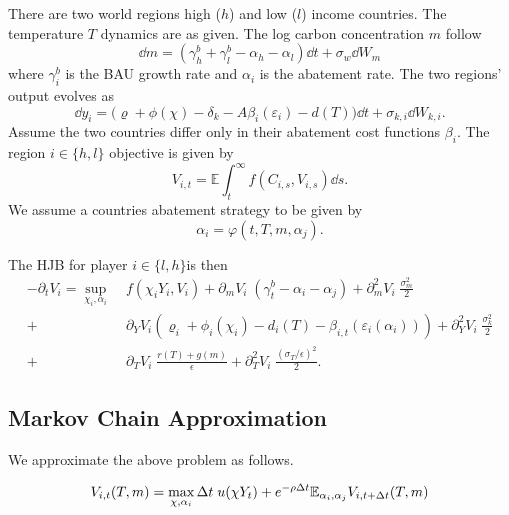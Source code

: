 \documentclass[../../main.tex]{subfiles}
\begin{document}
There are two world regions high ($h$) and low ($l$) income countries. The temperature $T$ dynamics are as given. The log carbon concentration $m$ follow \begin{equation}
    \dd{m} = \left( \gamma^b_h + \gamma^b_l - \alpha_h - \alpha_l \right) \dd{t} + \sigma_w \dd{W}_m
\end{equation} where $\gamma^b_i$ is the BAU growth rate and $\alpha_i$ is the abatement rate. The two regions' output evolves as \begin{equation}
    \dd{y}_i = \Big( \varrho + \phi(\chi) - \delta_k - A \beta_i(\varepsilon_i) - d(T) \Big) \dd{t} + \sigma_{k, i} \dd{W}_{k, i}.
\end{equation} Assume the two countries differ only in their abatement cost functions $\beta_i$. The region $i \in \{h, l\}$ objective is given by \begin{equation}
    V_{i, t} = \mathbb{E} \int_{t}^{\infty} f(C_{i, s}, V_{i, s}) \dd{s}.
\end{equation} We assume a countries abatement strategy to be given by \begin{equation}
    \alpha_i = \varphi(t, T, m, \alpha_j).
\end{equation}

The HJB for player $i \in \{l, h\} $is then \begin{equation} \label{eq:hjb}
    \begin{split}
        -\partial_t V_i = \sup_{\chi_i, \alpha_i} \; &f(\chi_i Y_i, V_i) + \partial_m V_i \; (\gamma^b_t - \alpha_i - \alpha_j) + \partial_m^2 V_i \; \frac{\sigma_m^2}{2}  \\ 
        + \; &\partial_Y V_i (\varrho_i + \phi_i(\chi_i) - d_i(T) - \beta_{i, t}(\varepsilon_i(\alpha_i))) +  \partial_Y^2 V_i \; \frac{\sigma_k^2}{2} \\
        + \; &\partial_T V_i \; \frac{r(T) + g(m)}{\epsilon} + \partial_T^2 V_i \; \frac{(\sigma_T / \epsilon)^2}{2}. 
    \end{split}
\end{equation}

\subsection{Markov Chain Approximation}

We approximate the above problem as follows.

\begin{equation}
    V_{i, t}(T, m) = \max_{\chi, \alpha_i} \Delta t \; u(\chi Y_t) + e^{-\rho \Delta t} \mathbb{E}_{\alpha_i, \alpha_j} V_{i, t + \Delta t}(T, m)
\end{equation}
\end{document}
